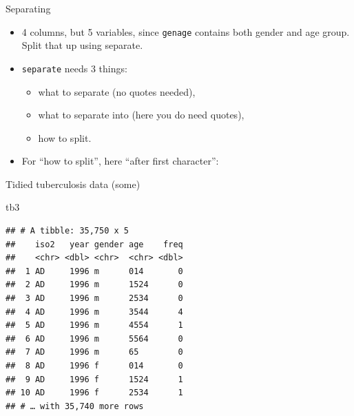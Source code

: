 \documentclass[ignorenonframetext,]{beamer}
\newenvironment{Shaded}{\begin{snugshade}}{\end{snugshade}}
\newcommand{\DecValTok}[1]{\textcolor[rgb]{0.00,0.00,0.81}{#1}}
\newcommand{\KeywordTok}[1]{\textcolor[rgb]{0.13,0.29,0.53}{\textbf{#1}}}
\newcommand{\NormalTok}[1]{#1}
\newcommand{\OperatorTok}[1]{\textcolor[rgb]{0.81,0.36,0.00}{\textbf{#1}}}
\newcommand{\StringTok}[1]{\textcolor[rgb]{0.31,0.60,0.02}{#1}}
\providecommand{\tightlist}{%
  \setlength{\itemsep}{0pt}\setlength{\parskip}{0pt}}
\begin{document}
\begin{frame}[fragile]{Separating}
\protect\hypertarget{separating}{}

\begin{itemize}
\tightlist
\item
  4 columns, but 5 variables, since \texttt{genage} contains both gender
  and age group. Split that up using separate.
\item
  \texttt{separate} needs 3 things:

  \begin{itemize}
  \tightlist
  \item
    what to separate (no quotes needed),
  \item
    what to separate into (here you do need quotes),
  \item
    how to split.
  \end{itemize}
\item
  For ``how to split'', here ``after first character'':
\end{itemize}

\begin{Shaded}
\end{Shaded}

\end{frame}

\begin{frame}[fragile]{Tidied tuberculosis data (some)}
\protect\hypertarget{tidied-tuberculosis-data-some}{}

\begin{Shaded}
\begin{Highlighting}[]
\NormalTok{tb3}
\end{Highlighting}
\end{Shaded}

\begin{verbatim}
## # A tibble: 35,750 x 5
##    iso2   year gender age    freq
##    <chr> <dbl> <chr>  <chr> <dbl>
##  1 AD     1996 m      014       0
##  2 AD     1996 m      1524      0
##  3 AD     1996 m      2534      0
##  4 AD     1996 m      3544      4
##  5 AD     1996 m      4554      1
##  6 AD     1996 m      5564      0
##  7 AD     1996 m      65        0
##  8 AD     1996 f      014       0
##  9 AD     1996 f      1524      1
## 10 AD     1996 f      2534      1
## # … with 35,740 more rows
\end{verbatim}

\end{frame}
\end{document}
